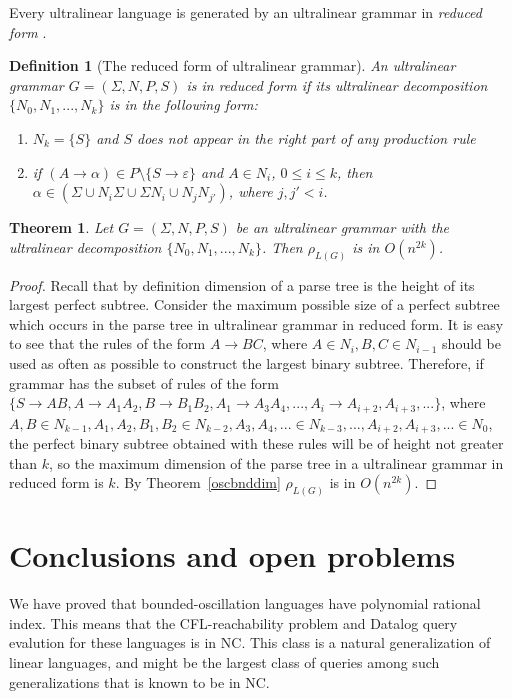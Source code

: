 \documentclass[11pt,a4paper]{article} %
\newtheorem{theorem}{Theorem}
\newtheorem{definition}{Definition}
\begin{document}
Every ultralinear language is generated by an ultralinear grammar in \textit{reduced form} \cite{WORKMAN1976188}.
\begin{definition}[The reduced form of ultralinear grammar]
An ultralinear grammar $G = (\Sigma, N, P, S)$ is in \textit{reduced form} if its ultralinear decomposition $\{N_0, N_1, ..., N_k\}$ is in the following form:
\begin{enumerate}
\item $N_k=\{S\}$ and $S$ does not appear in the right part of any production rule
\item if $(A \rightarrow \alpha) \in P \setminus \{S \rightarrow \varepsilon\}$ and $A \in N_i$, $0 \le i \le k$, then $\alpha \in (\Sigma \cup N_i\Sigma \cup \Sigma N_i \cup N_jN_{j'})$, where $j, j' < i$.
\end{enumerate}
\end{definition}
\begin {theorem}
Let $G = (\Sigma, N, P, S)$ be an ultralinear grammar with the ultralinear decomposition $\{N_0, N_1, ..., N_k\}$. Then $\rho_{L(G)}$ is in $O(n^{2k})$.
\end{theorem}
\begin{proof}
Recall that by definition dimension of a parse tree is the height of its largest perfect subtree. Consider the maximum possible size of a perfect subtree which occurs in the parse tree in ultralinear grammar in reduced form. It is easy to see that the rules of the form $A \rightarrow BC$, where $A \in N_i, B, C \in N_{i-1}$ should be used as often as possible to construct the largest binary subtree. Therefore, if grammar has the subset of rules of the form $\{S \rightarrow AB, A \rightarrow A_1A_2, B \rightarrow B_1B_2, A_1\rightarrow A_3A_4, ..., A_i \rightarrow A_{i+2}, A_{i+3}, ...\}$, where $A, B \in N_{k-1}, A_1, A_2, B_1, B_2 \in N_{k-2}, A_3, A_4, ... \in N_{k-3}, ... , A_{i+2}, A_{i+3}, ... \in N_0$, the perfect binary subtree obtained with these rules will be of height not greater than $k$, so the maximum dimension of the parse tree in a ultralinear grammar in reduced form is $k$. By Theorem~\ref{oscbnddim}  $\rho_{L(G)}$ is in $O(n^{2k})$.
\end{proof}


\section{Conclusions and open problems}
\label{sec:conc}

We have proved that bounded-oscillation languages
have polynomial rational index.
This means that the CFL-reachability problem and Datalog query evalution for these languages is in NC.
This class is a natural generalization of linear languages,
and might be the largest class of queries among such generalizations
that is known to be in NC.
\end{document}
